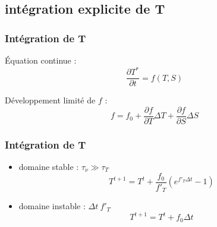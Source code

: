 \subsection{intégration explicite de T}

\begin{frame}
\frametitle{Intégration de T}

\'Equation continue :
$$ \frac{\partial T^*}{\partial t} = f(T,S)$$

Développement limité de $f$ :
$$ f = f_0 + \frac{\partial f}{\partial T} \Delta T + \frac{\partial f}{\partial S} \Delta S$$

\end{frame}

\begin{frame}
\frametitle{Intégration de T}
\begin{itemize}

\item domaine stable : $\tau_{\nu} \gg \tau_T$ 
$$T^{t+1} = T^t + \frac{f_0}{f'_T} \left( e^{f'_T \Delta t} - 1 \right) $$

\item domaine instable : $\Delta t\ f'_T$
$$T^{t+1} = T^t + f_0 \Delta t$$

\end{itemize}
\end{frame}

